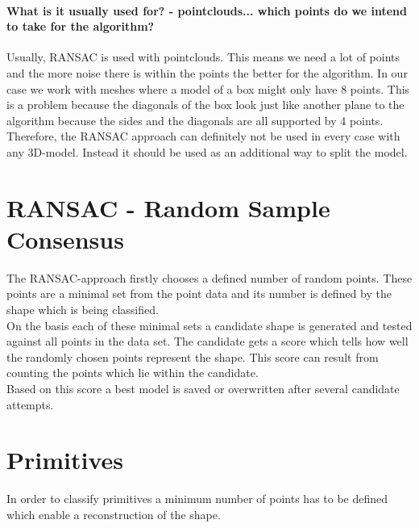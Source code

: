 \documentclass[../ClassicThesis.tex]{subfiles}
\begin{document}
\paragraph{What is it usually used for? - pointclouds... which points do we intend to take for the algorithm?}
Usually, RANSAC is used with pointclouds. This means we need a lot of points and the more noise there is within the points the better for the algorithm. In our case we work with meshes where a model of a box might only have 8 points. This is a problem because the diagonals of the box look just like another plane to the algorithm because the sides and the diagonals are all supported by 4 points. Therefore, the RANSAC approach can definitely not be used in every case with any 3D-model. Instead it should be used as an additional way to split the model.
\section{RANSAC - Random Sample Consensus}
The RANSAC-approach firstly chooses a defined number of random points. These points are a minimal set from the point data and its number is defined by the shape which is being classified.\\
On the basis each of these minimal sets a candidate shape is generated and tested against all points in the data set. The candidate gets a score which tells how well the randomly chosen points represent the shape. This score can result from counting the points which lie within the candidate.\\
Based on this score a best model is saved or overwritten after several candidate attempts.
\section{Primitives}
In order to classify primitives a minimum number of points has to be defined which enable a reconstruction of the shape.
\end{document}
